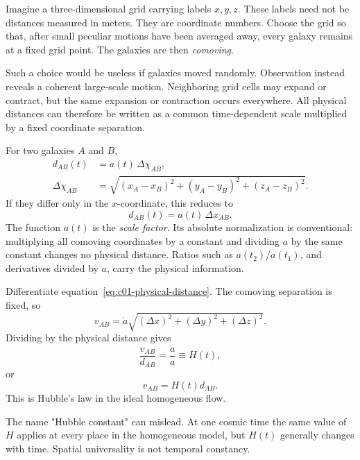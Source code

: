Imagine a three-dimensional grid carrying labels \(x,y,z\). These labels need not be distances measured in meters. They are coordinate numbers. Choose the grid so that, after small peculiar motions have been averaged away, every galaxy remains at a fixed grid point. The galaxies are then \emph{comoving}.

Such a choice would be useless if galaxies moved randomly. Observation instead reveals a coherent large-scale motion. Neighboring grid cells may expand or contract, but the same expansion or contraction occurs everywhere. All physical distances can therefore be written as a common time-dependent scale multiplied by a fixed coordinate separation.

For two galaxies \(A\) and \(B\),
\begin{equation}
\begin{aligned}
d_{AB}(t)&=a(t)\,\Delta\chi_{AB},\\
\Delta\chi_{AB}
&=\sqrt{(x_A-x_B)^2+(y_A-y_B)^2+(z_A-z_B)^2}.
\end{aligned}
\label{eq:c01-physical-distance}
\end{equation}
If they differ only in the \(x\)-coordinate, this reduces to
\begin{equation}
d_{AB}(t)=a(t)\,\Delta x_{AB}.
\end{equation}
The function \(a(t)\) is the \emph{scale factor}. Its absolute normalization is conventional: multiplying all comoving coordinates by a constant and dividing \(a\) by the same constant changes no physical distance. Ratios such as \(a(t_2)/a(t_1)\), and derivatives divided by \(a\), carry the physical information.

Differentiate equation~\eqref{eq:c01-physical-distance}. The comoving separation is fixed, so
\begin{equation}
v_{AB}=\dot a\sqrt{(\Delta x)^2+(\Delta y)^2+(\Delta z)^2}.
\end{equation}
Dividing by the physical distance gives
\begin{equation}
\frac{v_{AB}}{d_{AB}}=\frac{\dot a}{a}\equiv H(t),
\label{eq:c01-hubble-parameter}
\end{equation}
or
\begin{equation}
\boxed{v_{AB}=H(t)d_{AB}.}
\label{eq:c01-hubble-law}
\end{equation}
This is Hubble's law in the ideal homogeneous flow.

The name "Hubble constant" can mislead. At one cosmic time the same value of \(H\) applies at every place in the homogeneous model, but \(H(t)\) generally changes with time. Spatial universality is not temporal constancy.

